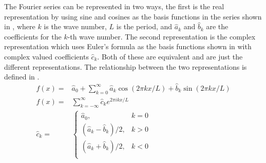 The Fourier series can be represented in two ways, the first is the real representation by using sine and cosines as the basis functions in the series shown in , where \(k\) is the wave number, \(L\) is the period, and \(\hat{a}_{k}\) and \(\hat{b}_{k}\) are the coefficients for the \(k\)-th wave number. The second representation is the complex representation which uses Euler's formula as the basis functions shown in  with complex valued coefficients \(\hat{c}_{k}\). Both of these are equivalent and are just the different representations. The relationship between the two representations is defined in .
\begin{align}
  f(x)=       & \hat{a}_0 + \sum_{k=0}^{\infty} \hat{a}_k\cos(2\pi kx/L) + \hat{b}_k\sin(2\pi kx/L)\label{eq:fourier_series_sine_cosine} \\
  f(x)=       & \sum_{k=-\infty}^{\infty} \hat{c}_k e^{2\pi ikx/L}\label{eq:fourier_series_complex}                                      \\
  \hat{c}_k = & \begin{cases}
                  \hat{a}_0,               & k = 0 \\
                  (\hat{a}_k-\hat{b}_k)/2, & k > 0 \\
                  (\hat{a}_k+\hat{b}_k)/2, & k < 0 \\
                \end{cases}\label{eq:fourier_coefficient_equivalency}
\end{align}

